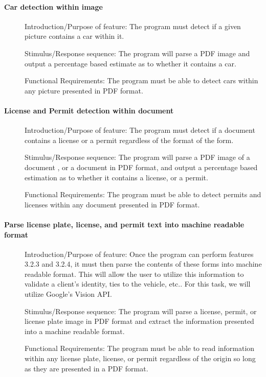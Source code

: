 \documentclass[article, onecolumn, draftclsnofoot,10pt, compsoc]{IEEEtran}
\begin{document}
\paragraph{Car detection within image}\vspace{.5cm}
\begin{description}
\item [] Introduction/Purpose of feature: The program must detect if a given picture contains a car within it.
\item [] Stimulus/Response sequence: The program will parse a PDF image and output a percentage based estimate as to whether it contains a car.
\item [] Functional Requirements: The program must be able to detect cars within any picture presented in PDF format.
\end{description}

\paragraph{License and Permit detection within document}\vspace{.5cm}
\begin{description}
\item [] Introduction/Purpose of feature: The program must detect if a document contains a license or a permit regardless of the format of the form.
\item [] Stimulus/Response sequence: The program will parse a PDF image of a document , or a document in PDF format, and output a percentage based estimation as to whether it contains a license, or a permit.
\item [] Functional Requirements: The program must be able to detect permits and licenses within any document presented in PDF format.
\end{description}

\paragraph{Parse license plate, license, and permit text into machine readable format}\vspace{.5cm}
\begin{description}
\item [] Introduction/Purpose of feature: Once the program can perform features 3.2.3 and 3.2.4, it must then parse the contents of these forms into machine readable format. This will allow the user to utilize this information to validate a client’s identity, ties to the vehicle, etc.. For this task, we will utilize Google’s Vision API.
\item [] Stimulus/Response sequence: The program will parse a license, permit, or license plate image in PDF format and extract the information presented into a machine readable format. 
\item [] Functional Requirements: The program must be able to read information within any license plate, license, or permit regardless of the origin so long as they are presented in a PDF format.
\end{description}
\end{document}
